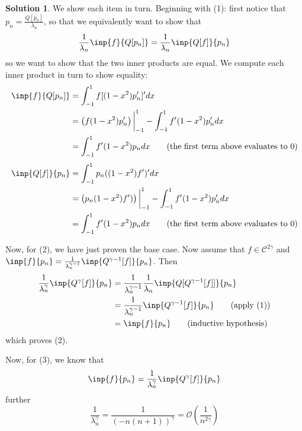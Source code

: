 \documentclass[12pt]{article}
\theoremstyle{definition}
\theoremstyle{definition}
\newtheorem{solution}{\color{Goldenrod}Solution}
\begin{document}
\begin{solution}
	We show each item in turn. Beginning with (1): first notice that $p_n = \frac{Q[p_n]}{\lambda_n}$, so that we equivalently want to show that
	\begin{equation}
		\frac{1}{\lambda_n} \inp{f}{Q[p_n]} = \frac{1}{\lambda_n}\inp{Q[f]}{p_n}
	\end{equation}
	so we want to show that the two inner products are equal. We compute each inner product in turn to show equality:
	\begin{align*}
		\inp{f}{Q[p_n]} &= \int_{-1}^1 f [(1-x^2)p_n']' dx \\
		&= \left(f(1-x^2)p_n'\right)\bigg\vert_{-1}^1 - \int_{-1}^1 f' (1-x^2)p_n' dx \\
		&= \int_{-1}^1 f' (1-x^2)p_n dx \tag{the first term above evaluates to $0$}
	\end{align*}
	\begin{align*}
		\inp{Q[f]}{p_n} &= \int_{-1}^1 p_n ((1-x^2)f')' dx \\
		&= \left(p_n(1-x^2)f')\right)\bigg\vert_{-1}^1 - \int_{-1}^1 f' (1-x^2)p_n' dx \\
		&= \int_{-1}^1 f' (1-x^2)p_n dx \tag{the first term above evaluates to $0$}
	\end{align*}
	
	Now, for (2), we have just proven the base case. Now assume that $f \in \mathcal{C}^{2\gamma}$ and $\inp{f}{p_n} = \frac{1}{\lambda_n^{\gamma-1}} \inp{Q^{\gamma-1}[f]}{p_n}$. Then
	\begin{align*}
		 \frac{1}{\lambda_n^{\gamma}} \inp{Q^{\gamma}[f]}{p_n} &= \frac{1}{\lambda_n^{\gamma -1 }} \frac{1}{\lambda_n} \inp{Q[Q^{\gamma-1}[f]]}{p_n} \\
		 &= \frac{1}{\lambda_n^{\gamma-1}} \inp{Q^{\gamma-1}[f]}{p_n} \tag{apply (1)} \\
		 &= \inp{f}{p_n} \tag{inductive hypothesis}
	\end{align*}
	which proves (2). 

	Now, for (3), we know that
	\begin{equation}
		\inp{f}{p_n} = \frac{1}{\lambda_n^\gamma} \inp{Q^\gamma[f]}{p_n}
	\end{equation}
	further
	\begin{equation}
		\frac{1}{\lambda_n^\gamma} = \frac{1}{(-n(n+1))^\gamma} = \mathcal{O}\left(\frac{1}{n^{2\gamma}}\right)
	\end{equation}
\end{solution}
\end{document}
